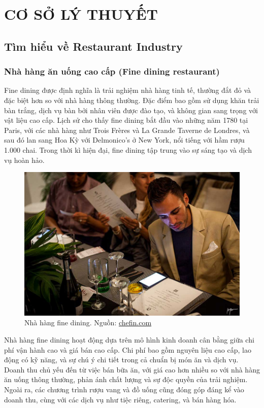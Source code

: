 \section{CƠ SỞ LÝ THUYẾT}
\subsection{Tìm hiểu về Restaurant Industry}

\subsubsection{Nhà hàng ăn uống cao cấp (Fine dining restaurant)}
Fine dining được định nghĩa là trải nghiệm nhà hàng tinh tế, thường đắt đỏ và đặc biệt hơn so với nhà hàng thông thường. Đặc điểm bao gồm sử dụng khăn trải bàn trắng, dịch vụ bàn bởi nhân viên được đào tạo, và không gian sang trọng với vật liệu cao cấp. Lịch sử cho thấy fine dining bắt đầu vào những năm 1780 tại Paris, với các nhà hàng như Trois Frères và La Grande Taverne de Londres, và sau đó lan sang Hoa Kỳ với Delmonico's ở New York, nổi tiếng với hầm rượu 1.000 chai. Trong thời kì hiện đại, fine dining tập trung vào sự sáng tạo và dịch vụ hoàn hảo.\\


\begin{figure}[H]
	\centering
	\includegraphics[width=15cm]{Images/fine-dining.jpg}
	\vspace{0.5cm}
	\caption{Nhà hàng fine dining. Nguồn: \href{https://chefin.com/blog/the-past-and-future-of-fine-dining/}{chefin.com}}
	\label{fig:my_label}
\end{figure}

Nhà hàng fine dining hoạt động dựa trên mô hình kinh doanh cân bằng giữa chi phí vận hành cao và giá bán cao cấp. Chi phí bao gồm nguyên liệu cao cấp, lao động có kỹ năng, và sự chú ý chi tiết trong cả chuẩn bị món ăn và dịch vụ. Doanh thu chủ yếu đến từ việc bán bữa ăn, với giá cao hơn nhiều so với nhà hàng ăn uống thông thường, phản ánh chất lượng và sự độc quyền của trải nghiệm. Ngoài ra, các chương trình rượu vang và đồ uống cũng đóng góp đáng kể vào doanh thu, cùng với các dịch vụ như tiệc riêng, catering, và bán hàng hóa. \\

